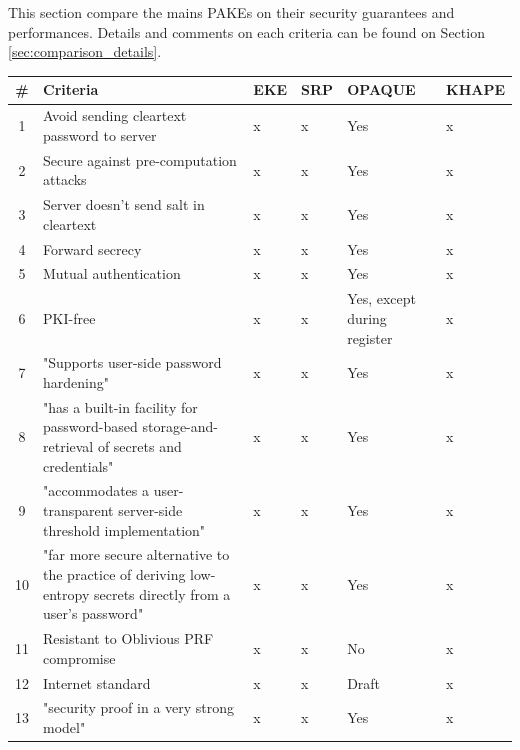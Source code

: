 \documentclass[../report.tex]{subfiles}
\begin{document}
\section{}

This section compare the mains PAKEs on their security guarantees and performances. Details and comments on each criteria can be found on Section \ref{sec:comparison_details}.

\begin{center}
   \begin{tabular}{ | c | p{8cm} || p{1cm} | p{1cm} | p{2cm} | p{2cm} | }
     \hline
     \textbf{\#} & \textbf{Criteria} & \textbf{EKE} & \textbf{SRP} & \textbf{OPAQUE} & \textbf{KHAPE} \\ \hline
     
     
     
     1 & Avoid sending cleartext password to server & x & x & Yes & x \\ \hline
     2 & Secure against pre-computation attacks & x & x & Yes & x \\ \hline
     3 & Server doesn't send salt in cleartext & x & x & Yes & x \\ \hline
     4 & Forward secrecy & x & x & Yes & x \\ \hline
     5 & Mutual authentication & x & x & Yes & x \\ \hline
     6 & PKI-free & x & x & Yes, except during register & x \\ \hline
     7 & "Supports user-side password hardening" & x & x & Yes & x \\ \hline
     8 & "has a built-in facility for password-based storage-and-retrieval of secrets and credentials" & x & x & Yes & x \\ \hline
     9 & "accommodates a user-transparent server-side threshold implementation" & x & x & Yes & x \\ \hline
     10 & "far more secure alternative to the practice of deriving low-entropy secrets directly from a user's password" & x & x & Yes & x \\ \hline
     
     11 & Resistant to Oblivious PRF compromise & x & x & No & x \\ \hline
     12 & Internet standard & x & x & Draft & x \\ \hline
     
     13 & "security proof in a very strong model" & x & x & Yes & x \\ \hline
     

\end{tabular}
\end{center}
\end{document}
